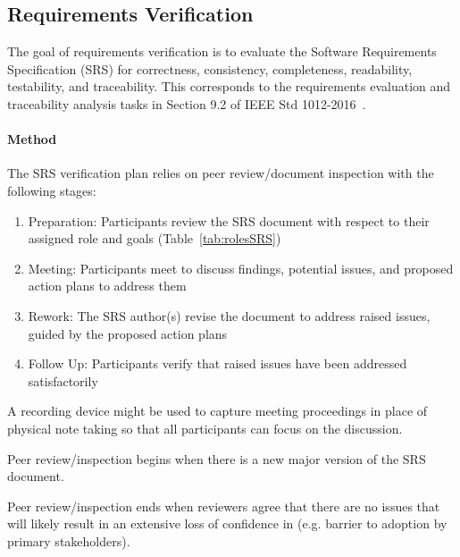 \subsection{Requirements Verification}\label{sec:srsVV}
The goal of requirements verification is to evaluate the Software Requirements
Specification (SRS) for correctness, consistency, completeness, readability,
testability, and traceability. This corresponds to the requirements evaluation
and traceability analysis tasks in Section 9.2 of IEEE Std
1012-2016~\citep{vvIEEE}.

\paragraph{Method} The SRS verification plan relies on peer review/document
inspection with the following stages:
\begin{enumerate}

    \item Preparation: Participants review the SRS document with respect to
    their assigned role and goals (Table~\ref{tab:rolesSRS})

    \item Meeting: Participants meet to discuss findings, potential issues, and
    proposed action plans to address them

    \item Rework: The SRS author(s) revise the document to address raised
    issues, guided by the proposed action plans

    \item Follow Up: Participants verify that raised issues have been addressed
    satisfactorily

\end{enumerate}

A recording device might be used to capture meeting proceedings in place of
physical note taking so that all participants can focus on the discussion.

Peer review/inspection begins when there is a new major version of the SRS
document.

Peer review/inspection ends when reviewers agree that there are no issues that
will likely result in an extensive loss of confidence in \progname{} (e.g.
barrier to adoption by primary stakeholders).

